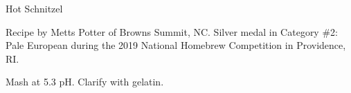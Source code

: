 \begin{recipe}{Hot Schnitzel}

\begin{aboutblock}
Recipe by Metts Potter of Browns Summit, NC. Silver medal in Category \#2: Pale
European during the 2019 National Homebrew Competition in Providence, RI.
\sourceaha
\end{aboutblock}


\begin{methodandtiming}
 
\begin{mashsteps}
\end{mashsteps}

\begin{fermentationsteps}
\end{fermentationsteps}

\begin{directions}
Mash at 5.3 pH. Clarify with gelatin.
\end{directions}

\end{methodandtiming}

\recipebreak

\begin{ingredientsblock}

\begin{malts}
\end{malts}

\begin{hops}
\end{hops}


\end{ingredientsblock}

\end{recipe}

